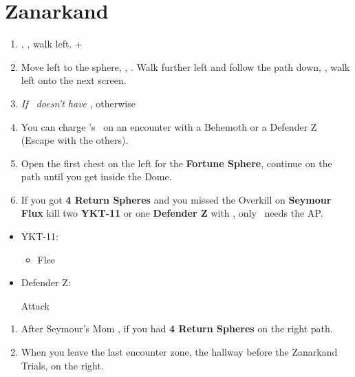 \chapter{Zanarkand}
\begin{enumerate}
    \item \sd, \cs[0:50], walk left. \fmv+\cs[2:20]
    \item Move left to the sphere, \sd, \cs[1:40]. Walk further left and follow the path down, \cs[3:20], walk left onto the next screen.
    \item \textit{If \rikku\ doesn't have \od} \formation{\tidus}{\auron}{\rikku}, otherwise \formation{\tidus}{\auron}{\kimahri}
    \item You can charge \rikku's \od\ on an encounter with a Behemoth or a Defender Z (Escape with the others).
    \item Open the first chest on the left for the \textbf{Fortune Sphere}, continue on the path until you get inside the Dome.
    \item If you got \textbf{4 Return Spheres} and you missed the Overkill on \textbf{Seymour Flux} kill two \textbf{YKT-11} or one \textbf{Defender Z} with \formation{\tidus}{\auron}{\yuna}, only \yuna\ needs the AP.
\end{enumerate}
\begin{encounters}
    \begin{itemize}
        \item YKT-11:
        \begin{itemize}
            \yunaf Attack
            \tidusf Attack
            \item Flee
        \end{itemize}
        \item Defender Z:
        \begin{itemize}
            \summon{\bahamut}
            \bahamutf Attack
        \end{itemize}
    \end{itemize}
\end{encounters}
\begin{enumerate}[resume]
    \item After Seymour's Mom \cs, if you had \textbf{4 Return Spheres}  on the right path.
    \item When you leave the last encounter zone, the hallway before the Zanarkand Trials,  on the right.
\end{enumerate}
